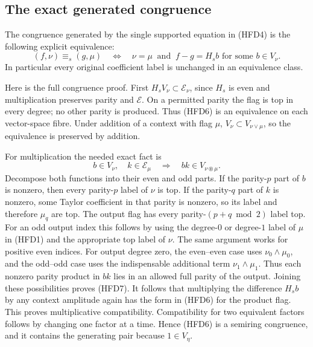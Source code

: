 \subsection{The exact generated congruence}

The congruence generated by the single supported equation
in (HFD4) is the following explicit equivalence:
\begin{equation}\tag{HFD6}
 (f,\nu)\equiv_s(g,\mu)
 \quad\Longleftrightarrow\quad
 \nu=\mu\ \text{ and }\ f-g=H_s b
                        \text{ for some }b\in V_\nu .
\end{equation}
In particular every original coefficient label is
unchanged in an equivalence class.

Here is the full congruence proof.
First $H_sV_\nu\subset\mathcal E_\nu$, since $H_s$
is even and multiplication preserves parity and
$\mathcal E$. On a permitted parity the flag is
top in every degree; no other parity is produced.
Thus (HFD6) is an equivalence on each vector-space
fibre. Under addition of a context with flag $\mu$,
$V_\nu\subset V_{\nu\vee\mu}$, so the equivalence is
preserved by addition.

For multiplication the needed exact fact is
\begin{equation}\tag{HFD7}
 b\in V_\nu,\quad k\in\mathcal E_\mu
       \quad\Longrightarrow\quad
 bk\in V_{\nu\circledast\mu}.
\end{equation}
Decompose both functions into their even and odd
parts. If the parity-$p$ part of $b$ is nonzero,
then every parity-$p$ label of $\nu$ is top.
If the parity-$q$ part of $k$ is nonzero, some
Taylor coefficient in that parity is nonzero, so
its label and therefore $\mu_q$ are top.
The output flag has every parity-$(p+q\bmod2)$
label top. For an odd output index this follows
by using the degree-$0$ or degree-$1$ label of
$\mu$ in (HFD1) and the appropriate top label
of $\nu$. The same argument works for positive
even indices. For output degree zero, the
even--even case uses $\nu_0\wedge\mu_0$,
and the odd--odd case uses the indispensable
additional term $\nu_1\wedge\mu_1$.
Thus each nonzero parity product in $bk$ lies
in an allowed full parity of the output.
Joining these possibilities proves (HFD7).
It follows that multiplying the difference $H_sb$
by any context amplitude again has the form in
(HFD6) for the product flag. This proves
multiplicative compatibility. Compatibility for
two equivalent factors follows by changing one
factor at a time. Hence (HFD6) is a semiring
congruence, and it contains the generating pair
because $1\in V_\eta$.

